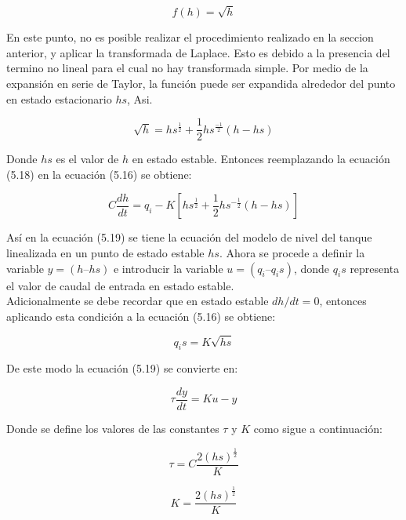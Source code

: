 \documentclass[a4paper,12pt,twoside]{proyectotanquesecci}
\begin{document}
\begin{equation}
f(h)=\sqrt{h}
\end{equation}

En este punto, no es posible realizar el procedimiento realizado en la seccion anterior, y aplicar la transformada de Laplace. Esto es debido a la presencia del termino no lineal para el cual no hay transformada simple. Por medio de la expansión en serie de Taylor, la función puede ser expandida alrededor del punto en estado estacionario $hs$, Asi.

\begin{equation}
\sqrt{h}=hs^{\frac{1}{2}}+\frac{1}{2}hs^{\frac{-1}{2}}(h-hs)
\end{equation}

Donde $hs$ es el valor de $h$ en estado estable. Entonces reemplazando la ecuación (5.18) en la ecuación (5.16) se obtiene:

\begin{equation}
C\frac{dh}{dt}=q_{i}-K\left[hs^{\frac{1}{2}}+\frac{1}{2} hs^{-\frac{1}{2}}\left(h-hs\right) \right]
\end{equation}

Así en la ecuación (5.19) se tiene la ecuación del modelo de nivel del tanque linealizada en un punto de estado estable $hs$. Ahora se procede a definir la variable $y=(h–hs)$ e introducir la variable $u=(q_{i}–q_{i}s)$, donde $q_{i}s$ representa el valor de caudal de entrada en estado estable. \\

Adicionalmente se debe recordar que en estado estable $dh/dt=0$, entonces aplicando esta condición a la ecuación (5.16) se obtiene:

\begin{equation}
q_{i}s=K\sqrt{hs}
\end{equation}

De este modo la ecuación (5.19) se convierte en:

\begin{equation}
\tau\frac{dy}{dt}=Ku-y
\end{equation}

Donde se define los valores de las constantes $\tau$ y $K$ como sigue a continuación:

\begin{equation}
\tau=C\frac{2(hs)^{\frac{1}{2}}}{K}
\end{equation}

\begin{equation}
K=\frac{2(hs)^{\frac{1}{2}}}{K}
\end{equation}
\end{document}
